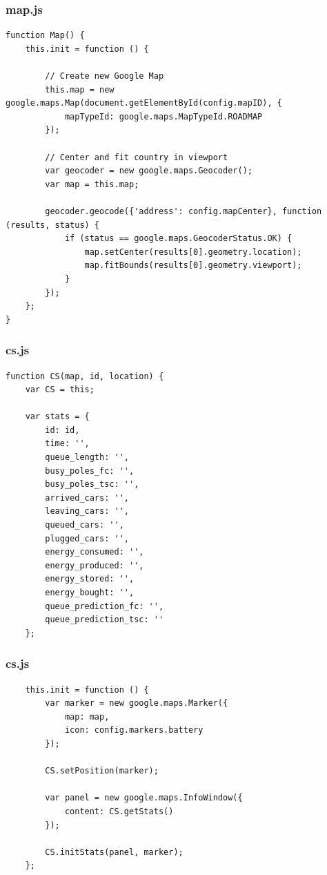 \begin{frame}[fragile]
\frametitle{map.js}

\begin{verbatim}
function Map() {
    this.init = function () {

        // Create new Google Map
        this.map = new google.maps.Map(document.getElementById(config.mapID), {
            mapTypeId: google.maps.MapTypeId.ROADMAP
        });

        // Center and fit country in viewport
        var geocoder = new google.maps.Geocoder();
        var map = this.map;

        geocoder.geocode({'address': config.mapCenter}, function (results, status) {
            if (status == google.maps.GeocoderStatus.OK) {
                map.setCenter(results[0].geometry.location);
                map.fitBounds(results[0].geometry.viewport);
            }
        });
    };
}
\end{verbatim}

\end{frame}
\clearpage



\begin{frame}[fragile]
\frametitle{cs.js}

\begin{verbatim}
function CS(map, id, location) {
    var CS = this;

    var stats = {
        id: id,
        time: '',
        queue_length: '',
        busy_poles_fc: '',
        busy_poles_tsc: '',
        arrived_cars: '',
        leaving_cars: '',
        queued_cars: '',
        plugged_cars: '',
        energy_consumed: '',
        energy_produced: '',
        energy_stored: '',
        energy_bought: '',
        queue_prediction_fc: '',
        queue_prediction_tsc: ''
    };
\end{verbatim}

\end{frame}
\clearpage



\begin{frame}[fragile]
\frametitle{cs.js}

\begin{verbatim}
    this.init = function () {
        var marker = new google.maps.Marker({
            map: map,
            icon: config.markers.battery
        });

        CS.setPosition(marker);

        var panel = new google.maps.InfoWindow({
            content: CS.getStats()
        });

        CS.initStats(panel, marker);
    };
\end{verbatim}

\end{frame}
\clearpage



